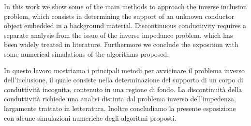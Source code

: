 \documentclass[10pt, a4paper, twoside, openright]{book}
\theoremstyle{definition}
\theoremstyle{plain}
\theoremstyle{plain}
\theoremstyle{plain}
\theoremstyle{plain}
\theoremstyle{plain}
\theoremstyle{plain}
\theoremstyle{plain}
\theoremstyle{plain}
\newcommand{\fncyblank}{\fancyhf{}}
\newenvironment{abstract} %
{\cleardoublepage
\fncyblank\null\vfill\begin{center} %
\bfseries\abstractname
\end{center}} %
{\vfill\null}
\newenvironment{abstractone} %
{\clearpage
\fncyblank\null\vfill\begin{center} %
\bfseries\abstractname
\end{center}} %
{\vfill\null}
\begin{document}
\begin{abstract}
 In this work we show some of the main methods 
 to approach the inverse inclusion problem, which consists in determining 
 the support of an unknown conductor object embedded in a background material. 
 Discontinuous conductivity requires a separate analysis from the issue 
 of the inverse impedance problem, which has been widely treated in literature. 
 Furthermore we conclude the exposition with some numerical simulations 
 of the algorithms proposed.
\end{abstract}
\begin{abstractone}
 In questo lavoro mostriamo i principali metodi per avvicinare il problema
 inverso dell'inclusione, il quale consiste nella determinazione del 
 supporto di un corpo di conduttività incognita, contenuto in una regione di fondo.
 La discontinuità della conduttività richiede una analisi distinta dal problema
 inverso dell'impedenza, largamente trattato in letteratura.
 Inoltre concludiamo la presente esposizione con alcune simulazioni numeriche 
 degli algoritmi proposti.
\end{abstractone}
\end{document}

